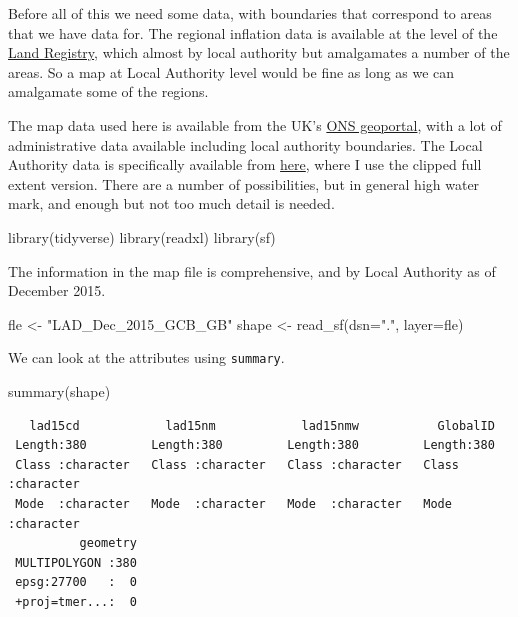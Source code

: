 \documentclass[
  letterpaper,
]{book}
\newenvironment{Shaded}{\begin{snugshade}}{\end{snugshade}}
\newcommand{\AttributeTok}[1]{\textcolor[rgb]{0.40,0.45,0.13}{#1}}
\newcommand{\FunctionTok}[1]{\textcolor[rgb]{0.28,0.35,0.67}{#1}}
\newcommand{\NormalTok}[1]{\textcolor[rgb]{0.00,0.23,0.31}{#1}}
\newcommand{\OtherTok}[1]{\textcolor[rgb]{0.00,0.23,0.31}{#1}}
\newcommand{\StringTok}[1]{\textcolor[rgb]{0.13,0.47,0.30}{#1}}
\begin{document}
Before all of this we need some data, with boundaries that correspond to
areas that we have data for. The regional inflation data is available at
the level of the
\href{https://www.gov.uk/government/organisations/land-registry}{Land
Registry}, which almost by local authority but amalgamates a number of
the areas. So a map at Local Authority level would be fine as long as we
can amalgamate some of the regions.

The map data used here is available from the UK's
\href{https://geoportal.statistics.gov.uk/}{ONS geoportal}, with a lot
of administrative data available including local authority boundaries.
The Local Authority data is specifically available from
\href{https://geoportal.statistics.gov.uk/maps/lad-dec-2015-generalised-clipped-boundaries-gb}{here},
where I use the clipped full extent version. There are a number of
possibilities, but in general high water mark, and enough but not too
much detail is needed.

\begin{Shaded}
\begin{Highlighting}[]
\FunctionTok{library}\NormalTok{(tidyverse)}
\FunctionTok{library}\NormalTok{(readxl)}
\FunctionTok{library}\NormalTok{(sf)}
\end{Highlighting}
\end{Shaded}

The information in the map file is comprehensive, and by Local Authority
as of December 2015.

\begin{Shaded}
\begin{Highlighting}[]
\NormalTok{fle }\OtherTok{\textless{}{-}} \StringTok{"LAD\_Dec\_2015\_GCB\_GB"}
\NormalTok{shape }\OtherTok{\textless{}{-}} \FunctionTok{read\_sf}\NormalTok{(}\AttributeTok{dsn=}\StringTok{"."}\NormalTok{, }\AttributeTok{layer=}\NormalTok{fle)}
\end{Highlighting}
\end{Shaded}

We can look at the attributes using \texttt{summary}.

\begin{Shaded}
\begin{Highlighting}[]
\FunctionTok{summary}\NormalTok{(shape)}
\end{Highlighting}
\end{Shaded}

\begin{verbatim}
   lad15cd            lad15nm            lad15nmw           GlobalID        
 Length:380         Length:380         Length:380         Length:380        
 Class :character   Class :character   Class :character   Class :character  
 Mode  :character   Mode  :character   Mode  :character   Mode  :character  
          geometry  
 MULTIPOLYGON :380  
 epsg:27700   :  0  
 +proj=tmer...:  0  
\end{verbatim}
\end{document}
